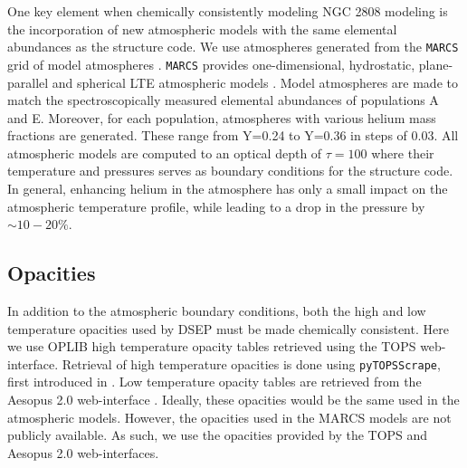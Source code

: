 One key element when chemically consistently modeling NGC 2808 modeling is the
incorporation of new atmospheric models with the same elemental abundances as
the structure code. We use atmospheres generated from the \texttt{MARCS} grid
of model atmospheres \citep{Plez2008}. \texttt{MARCS} provides one-dimensional,
hydrostatic, plane-parallel and spherical LTE atmospheric models
\citep{Gustafsson2008}. Model atmospheres are made to match the
spectroscopically measured elemental abundances of populations A and E.
Moreover, for each population, atmospheres with various helium mass fractions
are generated. These range from Y=0.24 to Y=0.36 in steps of 0.03. All
atmospheric models are computed to an optical depth of $\tau = 100$ where their
temperature and pressures serves as boundary conditions for the structure code.
In general, enhancing helium in the atmosphere has only a small impact on the atmospheric
temperature profile, while leading to a drop in the pressure by $\sim 10 - 20 \%$.

\subsection{Opacities}\label{sec:2808opac}
In addition to the atmospheric boundary conditions, both the high and low
temperature opacities used by DSEP must be made chemically consistent. Here we
use OPLIB high temperature opacity tables \citep{Colgan2016} retrieved using
the TOPS web-interface. Retrieval of high temperature opacities is done using
\texttt{pyTOPSScrape}, first introduced in \citet{Boudreaux2023}. Low
temperature opacity tables are retrieved from the Aesopus 2.0 web-interface
\citep{Marigo2009, Marigo2022}. Ideally, these opacities would be the same used
in the atmospheric models. However, the opacities used in the MARCS models are
not publicly available. As such, we use the opacities provided by the TOPS and
Aesopus 2.0 web-interfaces.
